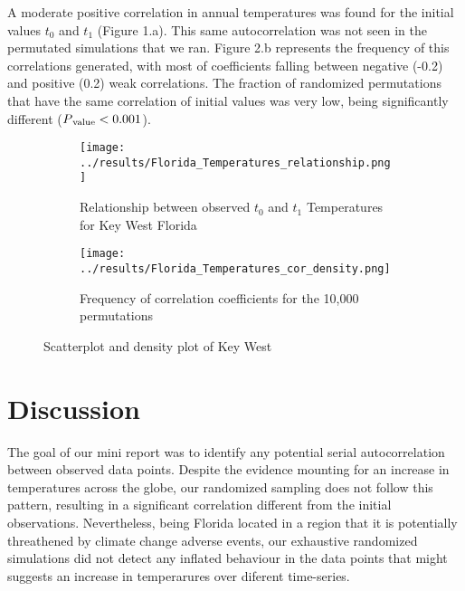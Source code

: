 \documentclass[12pt]{article}
\begin{document}
  A moderate positive correlation in annual temperatures was found for the initial values $t_0$ and $t_1$  (Figure 1.a). 
  This same autocorrelation was not seen in the permutated simulations that we ran. 
  Figure 2.b represents the frequency of this correlations generated, with most of coefficients falling between negative (-0.2) and positive (0.2) weak correlations.
  The fraction of randomized permutations that have the same correlation of initial values was very low, being significantly different ($ P\textsubscript{value} < 0.001 $).



    \begin{figure}[H]
      \centering
      \begin{subfigure}{.45\textwidth}
        \captionsetup{singlelinecheck = false, format = hang, justification = raggedright, font = footnotesize, labelsep = space}
        \centering
        \texttt{[image: ../results/Florida\_Temperatures\_relationship.png]}
        \caption{Relationship between observed $t_0$ and $t_1$ Temperatures for Key West Florida}
        \label{fig:sub1}
      \end{subfigure}
      \begin{subfigure}{.45\textwidth}
        \captionsetup{singlelinecheck = false, format = hang, justification = raggedright, font = footnotesize, labelsep = space}
        \centering
        \texttt{[image: ../results/Florida\_Temperatures\_cor\_density.png]}
        \caption{Frequency of correlation coefficients for the 10,000 permutations}
        \label{fig:sub2}
      \end{subfigure}
      \caption{Scatterplot and density plot of Key West}
      \label{fig:test}
    \end{figure}


  \section{Discussion}

  The goal of our mini report was to identify any potential serial autocorrelation between observed data points.
  Despite the evidence mounting for an increase in temperatures across the globe, our randomized sampling does not follow this pattern, resulting in a significant correlation different from the initial observations.
  Nevertheless, being Florida located in a region that it is potentially threathened by climate change adverse events, our exhaustive randomized simulations did not detect any inflated behaviour in the data points that might suggests an increase in temperarures over diferent time-series.


  
  
   
\end{document}
